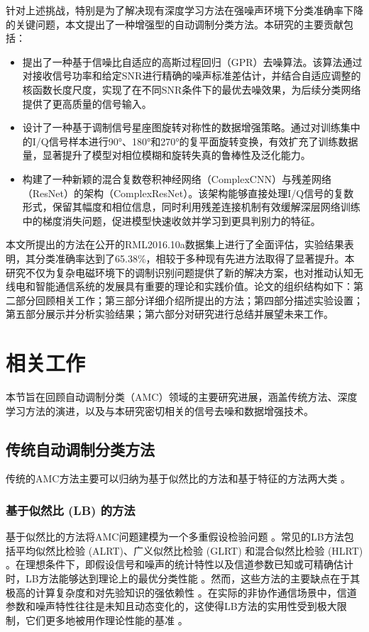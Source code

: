\documentclass[conference]{IEEEtran}
\begin{document}
针对上述挑战，特别是为了解决现有深度学习方法在强噪声环境下分类准确率下降的关键问题，本文提出了一种增强型的自动调制分类方法。本研究的主要贡献包括：
\begin{itemize}
    \item 提出了一种基于信噪比自适应的高斯过程回归（GPR）去噪算法。该算法通过对接收信号功率和给定SNR进行精确的噪声标准差估计，并结合自适应调整的核函数长度尺度，实现了在不同SNR条件下的最优去噪效果，为后续分类网络提供了更高质量的信号输入。
    \item 设计了一种基于调制信号星座图旋转对称性的数据增强策略。通过对训练集中的I/Q信号样本进行90°、180°和270°的复平面旋转变换，有效扩充了训练数据量，显著提升了模型对相位模糊和旋转失真的鲁棒性及泛化能力。
    \item 构建了一种新颖的混合复数卷积神经网络（ComplexCNN）与残差网络（ResNet）的架构（ComplexResNet）。该架构能够直接处理I/Q信号的复数形式，保留其幅度和相位信息，同时利用残差连接机制有效缓解深层网络训练中的梯度消失问题，促进模型快速收敛并学习到更具判别力的特征。
\end{itemize}
本文所提出的方法在公开的RML2016.10a数据集上进行了全面评估，实验结果表明，其分类准确率达到了65.38\%，相较于多种现有先进方法取得了显著提升。本研究不仅为复杂电磁环境下的调制识别问题提供了新的解决方案，也对推动认知无线电和智能通信系统的发展具有重要的理论和实践价值。论文的组织结构如下：第二部分回顾相关工作；第三部分详细介绍所提出的方法；第四部分描述实验设置；第五部分展示并分析实验结果；第六部分对研究进行总结并展望未来工作。

\section{相关工作}
本节旨在回顾自动调制分类（AMC）领域的主要研究进展，涵盖传统方法、深度学习方法的演进，以及与本研究密切相关的信号去噪和数据增强技术。

\subsection{传统自动调制分类方法}
传统的AMC方法主要可以归纳为基于似然比的方法和基于特征的方法两大类 \cite{[5]}\cite{[10]}。

\subsubsection{基于似然比 (LB) 的方法}
基于似然比的方法将AMC问题建模为一个多重假设检验问题 \cite{[5]}\cite{[8]}。常见的LB方法包括平均似然比检验 (ALRT)、广义似然比检验 (GLRT) 和混合似然比检验 (HLRT) \cite{[5]}\cite{[32_MISSING]}。在理想条件下，即假设信号和噪声的统计特性以及信道参数已知或可精确估计时，LB方法能够达到理论上的最优分类性能 \cite{[10]}\cite{[32_MISSING]}。然而，这些方法的主要缺点在于其极高的计算复杂度和对先验知识的强依赖性 \cite{[5]}\cite{[8]}\cite{[9_MISSING]}。在实际的非协作通信场景中，信道参数和噪声特性往往是未知且动态变化的，这使得LB方法的实用性受到极大限制，它们更多地被用作理论性能的基准 \cite{[5]}。
\end{document}
